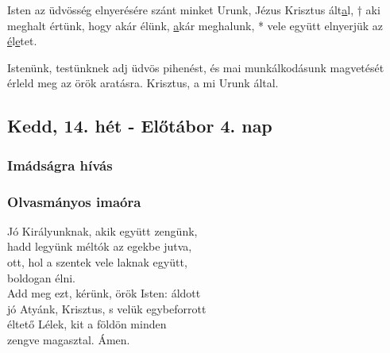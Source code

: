 \documentclass[twoside]{article}
\begin{document}
Isten az üdvösség elnyerésére szánt minket Urunk, Jézus Krisztus ált\underline{a}l, † aki meghalt
értünk, hogy akár élünk, \underline{a}kár meghalunk, * vele együtt elnyerjük az
\underline{é}l\underline{e}tet.

Istenünk, testünknek adj üdvös pihenést, és mai munkálkodásunk magvetését érleld meg az örök
aratásra. Krisztus, a mi Urunk által.

\subsection*{Kedd, 14. hét - Előtábor 4. nap}

\subsubsection*{Imádságra hívás}

\label{f3/Inv}



\subsubsection*{Olvasmányos imaóra}



Jó Királyunknak, akik együtt zengünk,\\
hadd legyünk méltók az egekbe jutva,\\
ott, hol a szentek vele laknak együtt,\\
boldogan élni.\\

Add meg ezt, kérünk, örök Isten: áldott\\
jó Atyánk, Krisztus, s velük egybeforrott\\
éltető Lélek, kit a földön minden\\
zengve magasztal. Ámen.



\end{document}
